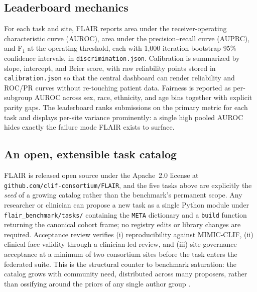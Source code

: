\subsection*{Leaderboard mechanics}

For each task and site, FLAIR reports area under the receiver-operating
characteristic curve (AUROC), area under the precision--recall curve
(AUPRC), and F$_1$ at the operating threshold, each with 1{,}000-iteration
bootstrap 95\% confidence intervals, in \texttt{discrimination.json}.
Calibration is summarized by slope, intercept, and Brier score, with raw
reliability points stored in \texttt{calibration.json} so that the
central dashboard can render reliability and ROC/PR curves without
re-touching patient data. Fairness is reported as per-subgroup AUROC across sex, race,
ethnicity, and age bins together with explicit parity gaps. The
leaderboard ranks submissions on the primary metric for each task and
displays per-site variance prominently: a single high pooled AUROC
hides exactly the failure mode FLAIR exists to surface.

\subsection*{An open, extensible task catalog}

FLAIR is released open source under the Apache~2.0 license at
\texttt{github.com/clif-consortium/FLAIR}, and the five tasks above
are explicitly the \emph{seed} of a growing catalog rather than the
benchmark's permanent scope. Any researcher or clinician can propose a
new task as a single Python module under
\texttt{flair\_benchmark/tasks/} containing the \texttt{META}
dictionary and a \texttt{build} function returning the canonical
cohort frame; no registry edits or library changes are required.
Acceptance review verifies (i) reproducibility against MIMIC-CLIF,
(ii) clinical face validity through a clinician-led review, and
(iii) site-governance acceptance at a minimum of two consortium sites
before the task enters the federated suite. This is the structural
counter to benchmark saturation: the catalog grows with community
need, distributed across many proposers, rather than ossifying around
the priors of any single author group
\citep{recht2019imagenet,chekroud2024illusory}.
